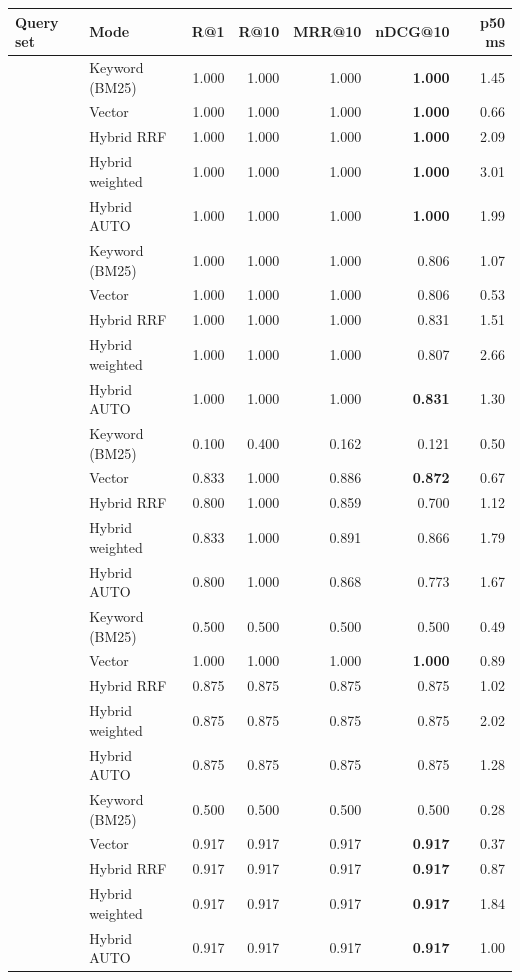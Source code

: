 \begin{tabular}{llrrrrr}
\toprule
Query set & Mode & R@1 & R@10 & MRR@10 & nDCG@10 & p50 ms \\
\midrule
{} & Keyword (BM25) & 1.000 & 1.000 & 1.000 & \textbf{1.000} & 1.45 \\
 & Vector & 1.000 & 1.000 & 1.000 & \textbf{1.000} & 0.66 \\
 & Hybrid RRF & 1.000 & 1.000 & 1.000 & \textbf{1.000} & 2.09 \\
 & Hybrid weighted & 1.000 & 1.000 & 1.000 & \textbf{1.000} & 3.01 \\
 & Hybrid AUTO & 1.000 & 1.000 & 1.000 & \textbf{1.000} & 1.99 \\
\midrule
{} & Keyword (BM25) & 1.000 & 1.000 & 1.000 & 0.806 & 1.07 \\
 & Vector & 1.000 & 1.000 & 1.000 & 0.806 & 0.53 \\
 & Hybrid RRF & 1.000 & 1.000 & 1.000 & 0.831 & 1.51 \\
 & Hybrid weighted & 1.000 & 1.000 & 1.000 & 0.807 & 2.66 \\
 & Hybrid AUTO & 1.000 & 1.000 & 1.000 & \textbf{0.831} & 1.30 \\
\midrule
{} & Keyword (BM25) & 0.100 & 0.400 & 0.162 & 0.121 & 0.50 \\
 & Vector & 0.833 & 1.000 & 0.886 & \textbf{0.872} & 0.67 \\
 & Hybrid RRF & 0.800 & 1.000 & 0.859 & 0.700 & 1.12 \\
 & Hybrid weighted & 0.833 & 1.000 & 0.891 & 0.866 & 1.79 \\
 & Hybrid AUTO & 0.800 & 1.000 & 0.868 & 0.773 & 1.67 \\
\midrule
{} & Keyword (BM25) & 0.500 & 0.500 & 0.500 & 0.500 & 0.49 \\
 & Vector & 1.000 & 1.000 & 1.000 & \textbf{1.000} & 0.89 \\
 & Hybrid RRF & 0.875 & 0.875 & 0.875 & 0.875 & 1.02 \\
 & Hybrid weighted & 0.875 & 0.875 & 0.875 & 0.875 & 2.02 \\
 & Hybrid AUTO & 0.875 & 0.875 & 0.875 & 0.875 & 1.28 \\
\midrule
{} & Keyword (BM25) & 0.500 & 0.500 & 0.500 & 0.500 & 0.28 \\
 & Vector & 0.917 & 0.917 & 0.917 & \textbf{0.917} & 0.37 \\
 & Hybrid RRF & 0.917 & 0.917 & 0.917 & \textbf{0.917} & 0.87 \\
 & Hybrid weighted & 0.917 & 0.917 & 0.917 & \textbf{0.917} & 1.84 \\
 & Hybrid AUTO & 0.917 & 0.917 & 0.917 & \textbf{0.917} & 1.00 \\
\bottomrule
\end{tabular}
